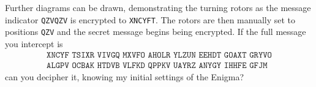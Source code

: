 \documentclass[m3380-lec-main.tex]{subfiles}
\begin{document}
\begin{exmp}
Further diagrams can be drawn, demonstrating the turning rotors as the message indicator \verb|QZVQZV| is encrypted to \verb|XNCYFT|. The rotors are then manually set to positions \verb|QZV| and the secret message begins being encrypted. If the full message you intercept is 
\begin{align*}
\texttt{XNCYF TSIXR VIVGQ MXVFO AHOLR YLZUN EEHDT GOAXT GRYVO}\\
\texttt{ALGPV OCBAK HTDVB VLFKD QPPKV UAYRZ ANYGY IHHFE GFJM~}
\end{align*}
can you decipher it, knowing my initial settings of the Enigma?
\end{exmp}
\end{document}
